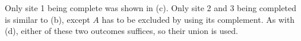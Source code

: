 \documentclass[letterpaper,12pt]{article}
\begin{document}
\begin{enumerate}
\begin{enumerate}
\begin{center}
        \end{center}
        Only site 1 being complete was shown in (c). Only site 2 and 3 being completed is similar to (b), except $A$ has to be excluded by using its complement. As with (d), either of these two outcomes suffices, so their union is used.
    \end{enumerate}
\end{enumerate}
\end{document}
